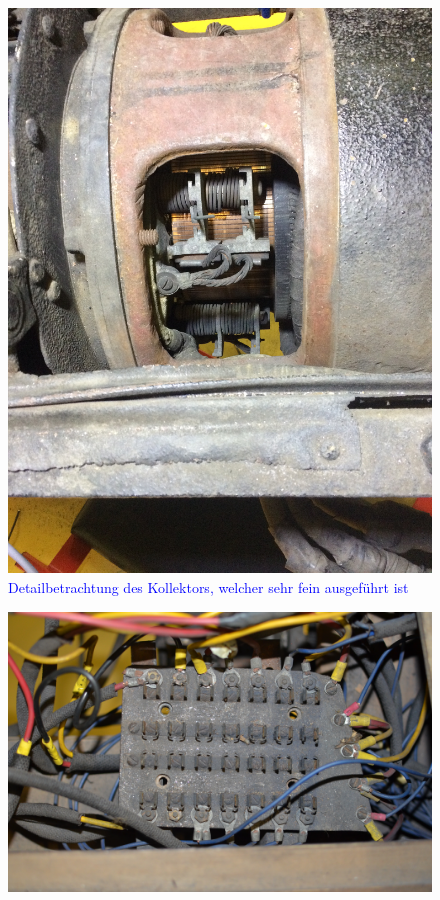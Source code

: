 \begin{landscape}
\begin{figure}[h]
		\includegraphics[angle=180,width=1.30\textwidth]{images/Anhang/Kollektor.jpg}
	\caption{\textcolor{blue}{Detailbetrachtung des Kollektors, welcher sehr fein ausgeführt ist}}
	\label{fig:Kollektor_Anhang}
\end{figure}
\begin{figure}[h]
	\centering
		\includegraphics[width=1.30\textwidth]{images/Anhang/Sicherungsbrett_Beleuchtung.jpg}

\end{figure}
\end{landscape}
